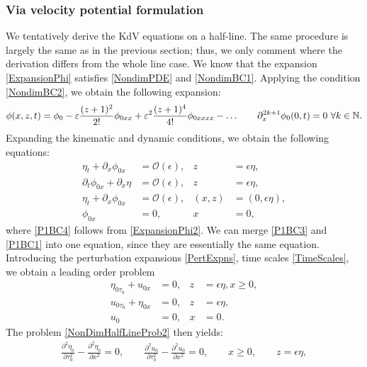 \documentclass[10pt,reqno,oneside,a4paper]{article}
\begin{document}
\subsubsection{Via velocity potential formulation}
We tentatively derive the KdV equations on a half-line. The same procedure is largely the same as in the previous section; thus, we only comment where the derivation differs from the whole line case. We know that the expansion \eqref{ExpansionPhi} satisfies \eqref{NondimPDE} and \eqref{NondimBC1}. Applying the condition \eqref{NondimBC2}, we obtain the following expansion:
\begin{equation}\label{ExpansionPhi2}
\phi(x,z,t) = \phi_0 - \varepsilon\frac{(z+1)^2}{2!}\phi_{0xx} + \varepsilon^2 \frac{(z+1)^4}{4!}\phi_{0xxxx} - \ldots \qquad \partial_x^{2k+1}\phi_0(0,t) = 0 ~\forall k \in \mathbb N.
\end{equation}
Expanding the kinematic and dynamic conditions, we obtain the following equations:
\begin{subequations} \label{NonDimHalfLineProb1}
\begin{align}
\label{P1BC1}\eta_t + \partial_x\phi_{0x} &= \mathcal{O}(\epsilon), &z &= \epsilon\eta, \\
\label{P1BC2}\partial_t\phi_{0x} + \partial_x \eta &=  \mathcal{O}(\epsilon), &z &= \epsilon\eta,  \\
\label{P1BC3}\eta_t + \partial_x\phi_{0x} &= \mathcal{O}(\epsilon), &(x,z) &= (0,\epsilon\eta), \\
\label{P1BC4}\phi_{0x} &= 0, &x &= 0,
\end{align}
\end{subequations}
where \eqref{P1BC4} follows from \eqref{ExpansionPhi2}. We can merge \eqref{P1BC3} and \eqref{P1BC1} into one equation, since they are essentially the same equation. Introducing the perturbation expansions \eqref{PertExpns}, time scales \eqref{TimeScales}, we obtain a leading order problem
\begin{subequations} \label{NonDimHalfLineProb2}
\begin{align}
\label{P2BC1}\eta_{0\tau_0} + u_{0x} &=0, &z &= \epsilon\eta, x \geq 0, \\
\label{P2BC2} u_{0\tau_0} + \eta_{0x} &= 0, &z &= \epsilon\eta,  \\
\label{P2BC3} u_0 &= 0, &x &= 0.
\end{align}
\end{subequations}
The problem \eqref{NonDimHalfLineProb2} then yields:
\begin{align*}
\frac{\partial^2 \eta_0}{\partial \tau_0^2} - \frac{\partial^2 \eta_0}{\partial x^2} = 0, \qquad \frac{\partial^2 u_0}{\partial \tau_0^2} - \frac{\partial^2 u_0}{\partial x^2} = 0, \qquad x\geq0, \qquad z= \epsilon \eta,
\end{align*}
\end{document}
